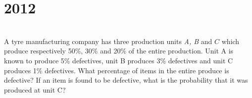 \section*{2012}
\vspace{-.5cm}
\hrulefill \smallskip\\
 A tyre manufacturing company has three production units \emph{A, B} and $C$ which produce respectively 50\%, 30\% and 20\% of the entire production. Unit A is known to produce 5\% defectives, unit B produces 3\% defectives and unit C produces 1\% defectives. What percentage of items in the entire produce is defective? If an item is found to be defective, what is the probability that it was produced at unit C?